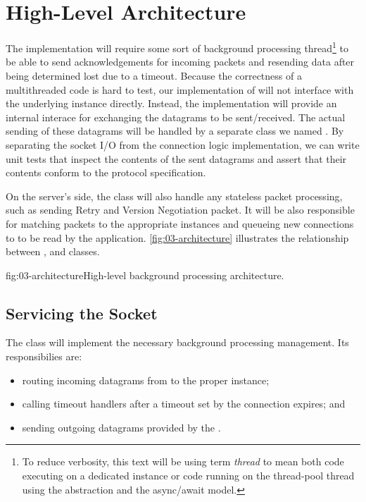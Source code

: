 \section{High-Level Architecture}

The \QuicConnection{} implementation will require some sort of background processing
thread\footnote{To reduce verbosity, this text will be using term \textit{thread} to mean both code
  executing on a dedicated  instance or code running on the thread-pool thread using
  the  abstraction and the \dotnet{} async/await model.} to be able to send
acknowledgements for incoming packets and resending data after being determined lost due to a
timeout. Because the correctness of a multithreaded code is hard to test, our implementation of
\QuicConnection{} will not interface with the underlying \Socket{} instance directly. Instead,
the implementation will provide an internal interace for exchanging the datagrams to be
sent/received. The actual sending of these datagrams will be handled by a separate class we named
\QuicSocketContext{}. By separating the socket I/O from the connection logic implementation, we can
write unit tests that inspect the contents of the sent datagrams and assert that their contents
conform to the protocol specification.

On the server's side, the \QuicSocketContext{} class will also handle any stateless packet
processing, such as sending Retry and Version Negotiation packet. It will be also responsible for
matching packets to the appropriate \QuicConnection{} instances and queueing new connections to \QuicListener{} to be read by the application. \autoref{fig:03-architecture} illustrates the relationship between \QuicSocketContext{}, \QuicConnection{} and \QuicListener{} classes.

\begin{myFigure}{fig:03-architecture}{High-level background processing architecture.}

  

\end{myFigure}

\subsection{Servicing the Socket}

The \QuicSocketContext{} class will implement the necessary background processing management. Its
responsibilies are:

\begin{itemize}

  \item routing incoming datagrams from \Socket{} to the proper \QuicConnection{}
  instance;

  \item calling timeout handlers after a timeout set by the connection expires; and

  \item sending outgoing datagrams provided by the \QuicConnection{}.

\end{itemize}

